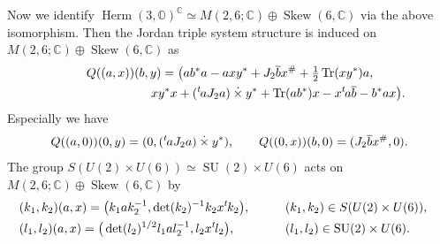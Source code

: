 \documentclass[pdftex]{sigma}
\numberwithin{equation}{section}
\newcommand{\BC}{\mathbb{C}}
\newcommand{\BO}{\mathbb{O}}
\newcommand{\Tr}{\operatorname{Tr}}
\newcommand{\dottimes}{\mathbin{\dot{\times}}}
\newcommand{\Skew}{\operatorname{Skew}}
\newcommand{\Herm}{\operatorname{Herm}}
\begin{document}
Now we identify $\Herm(3,\BO)^\BC\simeq M(2,6;\BC)\oplus\Skew(6,\BC)$ via the above isomorphism. Then the Jordan triple system structure
is induced on $M(2,6;\BC)\oplus\Skew(6,\BC)$ as
\begin{gather*}
Q((a,x))(b,y)=\big(ab^*a-axy^*+J_2\overline{b}x^\#+\tfrac{1}{2}\Tr(xy^*)a,\\
\hphantom{Q((a,x))(b,y)=\big(}{} xy^*x+({}^t\hspace{-1pt}aJ_2a)\dottimes y^*+\Tr(ab^*)x-x{}^t\hspace{-1pt}a\overline{b}-b^*ax\big).
\end{gather*}
Especially we have
\begin{gather*} Q((a,0))(0,y)=(0,({}^t\hspace{-1pt}aJ_2a)\dottimes y^*),\qquad Q((0,x))(b,0)=(J_2\overline{b}x^\#,0). \end{gather*}
The group $S(U(2)\times U(6))\simeq \operatorname{SU}(2)\times U(6)$ acts on $M(2,6;\BC)\oplus\Skew(6,\BC)$ by
\begin{alignat*}{3}
& (k_1,k_2)(a,x)=\big(k_1ak_2^{-1},\det(k_2)^{-1}k_2x{}^t\hspace{-1pt}k_2\big), \qquad && (k_1,k_2)\in S(U(2)\times U(6)),&\\
&(l_1,l_2)(a,x)=\big(\det(l_2)^{1/2}l_1al_2^{-1},l_2x{}^t\hspace{-1pt}l_2\big), \qquad && (l_1,l_2)\in \operatorname{SU}(2)\times U(6).&
\end{alignat*}
\end{document}
